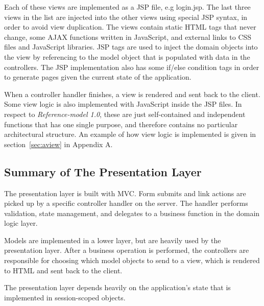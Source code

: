 Each of these views are implemented as a JSP file, e.g login.jsp. The last three views in the list are injected into the other views using special JSP syntax, in order to avoid view duplication. The views contain static HTML tags that never change, some AJAX functions written in JavaScript, and external links to CSS files and JavaScript libraries. JSP tags are used to inject the domain objects into the view by referencing to the model object that is populated with data in the controllers. The JSP implementation also has some if/else condition tags in order to generate pages given the current state of the application. 

When a controller handler finishes, a view is rendered and sent back to the client. Some view logic is also implemented with JavaScript inside the JSP files. In respect to \textit{Reference-model 1.0}, these are just self-contained and independent functions that has one single purpose, and therefore contains no particular architectural structure. An example of how view logic is implemented is given in section~\ref{sec:aview} in Appendix A. 

\subsection{Summary of The Presentation Layer}
The presentation layer is built with MVC. Form submits and link actions are picked up by a specific controller handler on the server. The handler performs validation, state management, and delegates to a business function in the domain logic layer.

Models are implemented in a lower layer, but are heavily used by the presentation layer. After a business operation is performed, the controllers are responsible for choosing which model objects to send to a view, which is rendered to HTML and sent back to the client.

The presentation layer depends heavily on the application's state that is implemented in session-scoped objects.
			
